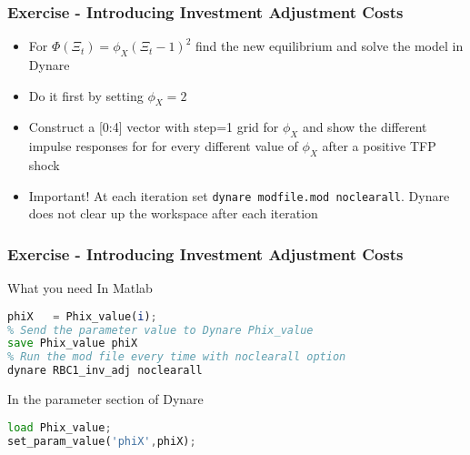 \documentclass[xcolor=dvipsnames,handout,aspectratio=169]{beamer}
\begin{document}
\begin{frame}[t]\frametitle{\textbf{Exercise - Introducing Investment Adjustment Costs}}
  \begin{itemize}
      \setlength\itemsep{1em}
\item For  $\Phi(\Xi_t)=\phi_X (\Xi_t-1)^2$ find the new equilibrium and solve the model in Dynare
\item Do it first by setting  $\phi_X = 2$
\item Construct a [0:4] vector with step=1 grid for $\phi_X$ and show the different impulse responses for {\color{blue}{ouput, consumption, investment and labour hours}} for every different value of $\phi_X$ after a positive TFP shock
\item Important! At each iteration set \texttt{dynare modfile.mod \color{magenta}noclearall}. Dynare does not clear up the workspace after each iteration
 \end{itemize}
\end{frame}


\begin{frame}[containsverbatim]\frametitle{\textbf{Exercise - Introducing Investment Adjustment Costs}}
 What you need
  In Matlab
\begin{lstlisting}[language=Octave]  
% Give to Phix the value of every iteration
phiX   = Phix_value(i); 
% Send the parameter value to Dynare Phix_value       
save Phix_value phiX  
% Run the mod file every time with noclearall option        
dynare RBC1_inv_adj noclearall
\end{lstlisting}

In the parameter section of Dynare 

\begin{lstlisting}[language=Octave]
load Phix_value;
set_param_value('phiX',phiX); 
\end{lstlisting}
\end{frame}






 
\end{document}
